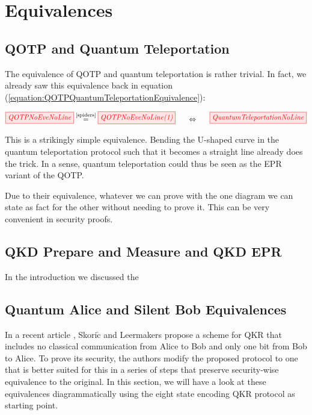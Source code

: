 \documentclass[]{article}
\newcommand{\equaltext}[1]{\ensuremath{\stackrel{\text{#1}}{=}}}
\begin{document}
\section{Equivalences}
\label{Equivalences}

\subsection{QOTP and Quantum Teleportation}

The equivalence of QOTP and quantum teleportation is rather trivial. In fact, we already saw this equivalence back in equation (\ref{equation:QOTPQuantumTeleportationEquivalence}):

\begin{equation}
\tikzfig{QOTPNoEveNoLine} \equaltext{\ref{spiders}} \tikzfig{QOTPNoEveNoLine(1)}~~~~~ \Leftrightarrow ~~~~~\tikzfig{QuantumTeleportationNoLine}
\end{equation}

This is a strikingly simple equivalence. Bending the U-shaped curve in the quantum teleportation protocol such that it becomes a straight line already does the trick. In a sense, quantum teleportation could thus be seen as the EPR variant of the QOTP. 

Due to their equivalence, whatever we can prove with the one diagram we can state as fact for the other without needing to prove it. This can be very convenient in security proofs.

\subsection{QKD Prepare and Measure and QKD EPR}

In the introduction we discussed the

\subsection{Quantum Alice and Silent Bob Equivalences}

\label{section:QAaSBEequivalences}
In a recent article \cite{Leermakers2019}, Skori$\check{\textrm{c}}$ and Leermakers propose a scheme for QKR that includes no classical communication from Alice to Bob and only one bit from Bob to Alice. To prove its security, the authors modify the proposed protocol to one that is better suited for this in a series of steps that preserve security-wise equivalence to the original. In this section, we will have a look at these equivalences diagrammatically using the eight state encoding QKR protocol as starting point. 
\end{document}
